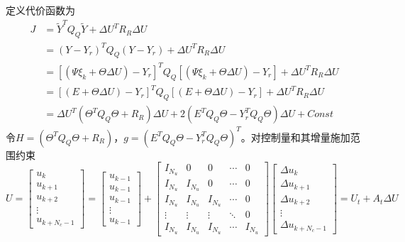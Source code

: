             定义代价函数为
            \begin{equation}
            \begin{aligned}
            J &= \tilde{Y}^T Q_Q \tilde{Y} + \Delta U^T R_R \Delta U \\
            &= (Y - Y_r)^T Q_Q (Y - Y_r) + \Delta U^T R_R \Delta U \\
            &= [(\Psi \xi_k + \Theta \Delta U) - Y_r]^T Q_Q [(\Psi \xi_k + \Theta \Delta U) - Y_r] + \Delta U^T R_R \Delta U \\
            &= [(E + \Theta \Delta U) - Y_r]^T Q_Q [(E + \Theta \Delta U) - Y_r] + \Delta U^T R_R \Delta U \\
            &= \Delta U^T (\Theta^T Q_Q \Theta + R_R) \Delta U + 2(E^T Q_Q \Theta - Y_r^T Q_Q \Theta) \Delta U + Const
            \end{aligned}
            \end{equation}
            令$H = (\Theta^T Q_Q \Theta + R_R)$，$g = (E^T Q_Q \Theta - Y_r^T Q_Q \Theta)^T$。对控制量和其增量施加范围约束
            \begin{equation}
            U = \begin{bmatrix}
            u_k \\ u_{k+1} \\ u_{k+2} \\ \vdots \\ u_{k+N_c - 1}
            \end{bmatrix} = \begin{bmatrix}
            u_{k-1} \\ u_{k-1} \\ u_{k-1} \\ \vdots \\ u_{k-1}
            \end{bmatrix} + \begin{bmatrix}
            I_{N_u} & 0 & 0 & \cdots & 0 \\
            I_{N_u} & I_{N_u} & 0 & \cdots & 0 \\
            I_{N_u} & I_{N_u} & I_{N_u} & \cdots & 0 \\
            \vdots & \vdots & \vdots & \ddots & 0 \\
            I_{N_u} & I_{N_u} & I_{N_u} & \cdots & I_{N_u}
            \end{bmatrix} \begin{bmatrix}
            \Delta u_k \\ \Delta u_{k+1} \\ \Delta u_{k+2} \\ \vdots \\ \Delta u_{k+N_c - 1}
            \end{bmatrix} = U_t + A_t \Delta U
            \end{equation}

